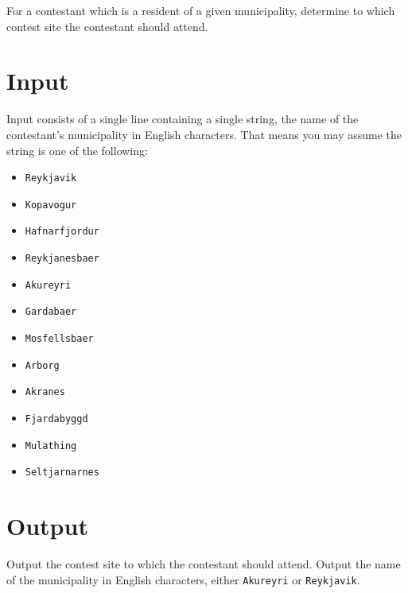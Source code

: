 For a contestant which is a resident of a given municipality, determine to which contest site the contestant should attend.

\section*{Input}
Input consists of a single line containing a single string, the name of the contestant's municipality in English characters.
That means you may assume the string is one of the following:

\begin{itemize}
    \item \texttt{Reykjavik}
    \item \texttt{Kopavogur}
    \item \texttt{Hafnarfjordur}
    \item \texttt{Reykjanesbaer}
    \item \texttt{Akureyri}
    \item \texttt{Gardabaer}
    \item \texttt{Mosfellsbaer}
    \item \texttt{Arborg}
    \item \texttt{Akranes}
    \item \texttt{Fjardabyggd}
    \item \texttt{Mulathing}
    \item \texttt{Seltjarnarnes}
\end{itemize}

\section*{Output}
Output the contest site to which the contestant should attend.
Output the name of the municipality in English characters, either \texttt{Akureyri} or \texttt{Reykjavik}.
